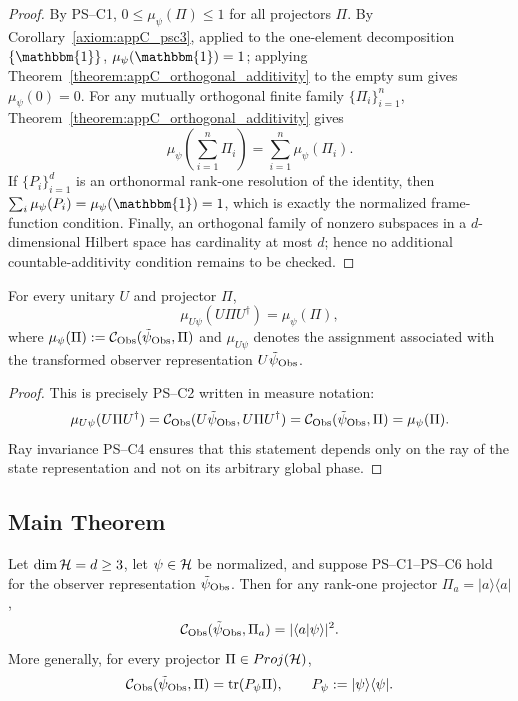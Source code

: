 \begin{proof}
\label{proof:appC_sigma_additivity}
By PS--C1, $0\le \mu_\psi(\Pi)\le 1$ for all projectors $\Pi$. By
Corollary~\ref{axiom:appC_psc3}, applied to the one-element decomposition
$\{\mathbbm{1}\}$, $\mu_\psi(\mathbbm{1})=1$; applying
Theorem~\ref{theorem:appC_orthogonal_additivity} to the empty sum gives
$\mu_\psi(0)=0$. For any mutually orthogonal finite family
$\{\Pi_i\}_{i=1}^n$, Theorem~\ref{theorem:appC_orthogonal_additivity} gives
\[
\mu_\psi\!\left(\sum_{i=1}^n \Pi_i\right)=\sum_{i=1}^n \mu_\psi(\Pi_i).
\]
If $\{P_i\}_{i=1}^d$ is an orthonormal rank-one resolution of the identity, then
$\sum_i\mu_\psi(P_i)=\mu_\psi(\mathbbm{1})=1$, which is exactly the normalized
frame-function condition. Finally, an orthogonal family of nonzero subspaces in a
$d$-dimensional Hilbert space has cardinality at most $d$; hence no additional
countable-additivity condition remains to be checked.
\end{proof}

\begin{lemma}
\label{lemma:appC_unitary_invariance}
For every unitary $U$ and projector $\Pi$,
\[
\mu_{U\psi}(U\Pi U^\dagger)=\mu_\psi(\Pi),
\]
where $\mu_\psi(\Pi):=\mathcal{C}_{\mathrm{Obs}}(\tilde\psi_{\mathrm{Obs}},\Pi)$ and
$\mu_{U\psi}$ denotes the assignment associated with the transformed observer
representation $U\tilde\psi_{\mathrm{Obs}}$.
\end{lemma}

\begin{proof}
\label{proof:appC_unitary_invariance}
This is precisely PS--C2 written in measure notation:
\[
\mu_{U\psi}(U\Pi U^\dagger)
=\mathcal{C}_{\mathrm{Obs}}(U\tilde\psi_{\mathrm{Obs}},U\Pi U^\dagger)
=\mathcal{C}_{\mathrm{Obs}}(\tilde\psi_{\mathrm{Obs}},\Pi)
=\mu_\psi(\Pi).
\]
Ray invariance PS--C4 ensures that this statement depends only on the ray of the
state representation and not on its arbitrary global phase.
\end{proof}

\subsection{Main Theorem}
\label{subsec:appC_born_theorem}

\begin{theorem}
\label{theorem:appC_born_rule}
Let $\dim \mathcal{H} = d \geq 3$, let $\psi\in\mathcal{H}$ be normalized, and suppose
PS--C1--PS--C6 hold for the observer representation $\tilde\psi_{\mathrm{Obs}}$. Then for
any rank-one projector $\Pi_a = |a\rangle \langle a|$,
\[
\mathcal{C}_{\mathrm{Obs}}(\tilde\psi_{\mathrm{Obs}}, \Pi_a)
= |\langle a | \psi \rangle|^2 .
\]
More generally, for every projector $\Pi\in Proj(\mathcal{H})$,
\[
\mathcal{C}_{\mathrm{Obs}}(\tilde\psi_{\mathrm{Obs}},\Pi)=\operatorname{tr}(P_\psi\Pi),
\qquad P_\psi:=|\psi\rangle\langle\psi|.
\]
\end{theorem}

